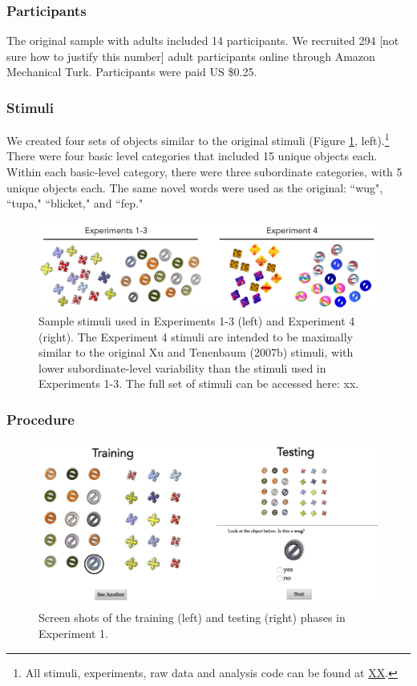 \documentclass[man]{apa2}
\begin{document}
\subsubsection{Participants} 
The original sample with adults included 14 participants. We recruited 294 [not sure how to justify this number] adult participants online through Amazon Mechanical Turk. Participants were paid US \$0.25. 
\subsubsection{Stimuli}
We created four sets of objects similar to the original  stimuli (Figure \ref{fig:stims}, left).\footnote{All stimuli, experiments, raw data and analysis code can be found at \url{XX}.} There were four basic level categories that included 15 unique objects each. Within each basic-level category, there were three subordinate categories, with 5 unique objects each. The same novel words were used as the original: ``wug", ``tupa," ``blicket," and ``fep."
\begin{figure}[t]
 \begin{center} 
  \includegraphics[width=5in]{figures/stims.png} 
  \caption{ \label{fig:stims} Sample stimuli used in Experiments 1-3 (left) and Experiment 4 (right). The Experiment 4 stimuli are intended to be maximally similar to the original Xu and Tenenbaum (2007b) stimuli, with lower subordinate-level variability than the stimuli used in Experiments 1-3. The full set of stimuli can be accessed here: xx. 
 } 
 \end{center} 
\end{figure}	
 
\subsubsection{Procedure}
 \begin{figure} [t]
 \begin{center} 
  \includegraphics[width=5.5in]{figures/screen.png} 
  \caption{\label{fig:screen} Screen shots of the training (left) and testing (right) phases in Experiment 1. } 
 \end{center} 
\end{figure}
\end{document}
